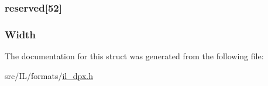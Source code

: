 \hypertarget{struct_d_p_x___i_m_a_g_e___i_n_f_o_a91afcb45fc1b2422045d944bcb0b7117}{
\subsubsection[{reserved}]{ reserved\mbox{[}52\mbox{]}}}\label{struct_d_p_x___i_m_a_g_e___i_n_f_o_a91afcb45fc1b2422045d944bcb0b7117}
\hypertarget{struct_d_p_x___i_m_a_g_e___i_n_f_o_a4146e7b2b0b4097e0e335f9b348392bf}{
\subsubsection[{Width}]{ Width}}\label{struct_d_p_x___i_m_a_g_e___i_n_f_o_a4146e7b2b0b4097e0e335f9b348392bf}


The documentation for this struct was generated from the following file\-:\begin{DoxyCompactItemize}
\item 
src/\-I\-L/formats/\hyperlink{il__dpx_8h}{il\-\_\-dpx.\-h}\end{DoxyCompactItemize}

